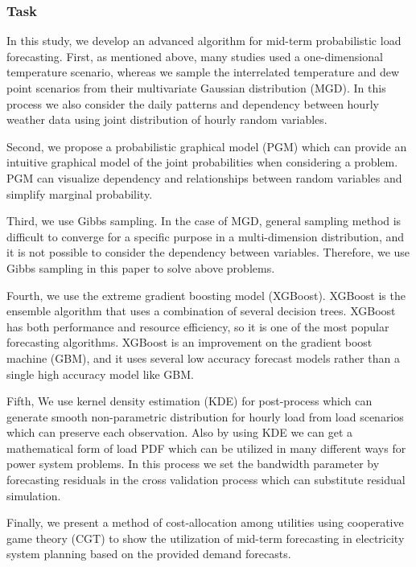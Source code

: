 \documentclass[journal]{IEEEtran} %
\begin{document}
\subsubsection{Task}
In this study, we develop an advanced algorithm for mid-term probabilistic load forecasting. First, as mentioned above, many studies used a one-dimensional temperature scenario, whereas we sample the interrelated temperature and dew point  scenarios from their multivariate Gaussian distribution (MGD). In this process we also consider the daily patterns and dependency between hourly weather data using joint distribution of hourly random variables. %

Second, we propose a probabilistic graphical model (PGM) which can provide an intuitive graphical model of the joint probabilities when considering a problem. PGM can visualize dependency and relationships between random variables and simplify marginal probability.

Third, we use Gibbs sampling. In the case of MGD, general sampling method is difficult to converge for a specific purpose in a multi-dimension distribution, and it is not possible to consider the dependency between variables. Therefore, we use Gibbs sampling in this paper to solve above problems.

Fourth, we use the extreme gradient boosting model (XGBoost). XGBoost is the ensemble algorithm that uses a combination of several decision trees. XGBoost has both performance and resource efficiency, so it is one of the most popular forecasting algorithms. XGBoost is an improvement on the gradient boost machine (GBM), and it uses several low accuracy forecast models rather than a single high accuracy model like GBM.   

Fifth, We use kernel density estimation (KDE) for post-process which can generate smooth non-parametric distribution for hourly load from load scenarios which can preserve each observation. Also by using KDE we can get a mathematical form of load PDF which can be utilized in many different ways for power system problems. In this process we set the bandwidth parameter by forecasting residuals in the cross validation process which can substitute residual simulation.

Finally, we present a method of cost-allocation among utilities using cooperative game theory (CGT) to show the utilization of mid-term forecasting in electricity system planning based on the provided demand forecasts.
 
\end{document}
